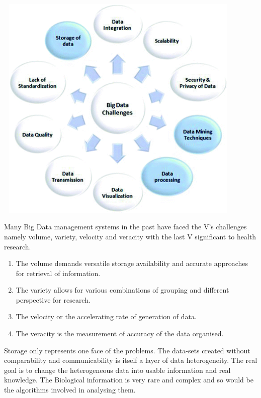 \documentclass[10pt,a4paper,twoside]{article}
\begin{document}
\begin{center}
    \includegraphics[width=12cm, height=11cm]{bdc} \\[\baselineskip]
\end{center}

Many Big Data management systems in the past have faced the V’s challenges namely volume, variety, velocity and veracity with the last V significant to health research.

\begin{enumerate}
    \item 	The volume demands versatile storage availability and accurate approaches for retrieval of information.
    \item	The variety allows for various combinations of grouping and different perspective for research.
    \item   The velocity or the accelerating rate of generation of data.
    \item	The veracity is the measurement of accuracy of the data organised.
\end{enumerate}

Storage only represents one face of the problems. The data-sets created without comparability and communicability is itself a layer of data heterogeneity. The real goal is to change the heterogeneous data into usable information and real knowledge. The Biological information is very rare and complex and so would be the algorithms involved in analysing them. \\[\baselineskip]
\end{document}
